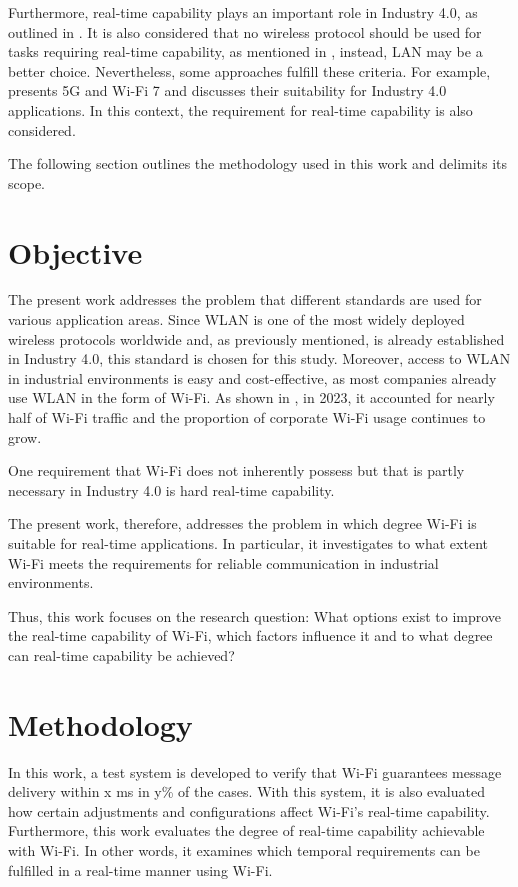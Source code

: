 Furthermore, real-time capability plays an important role in Industry 4.0, as outlined in \cite[p. 1]{fi16090345}.  
It is also considered that no wireless protocol should be used for tasks requiring real-time capability, as mentioned in \cite{wollert}, instead, LAN may be a better choice.  
Nevertheless, some approaches fulfill these criteria.  
For example, \cite{fi16090345} presents 5G and Wi-Fi 7 and discusses their suitability for Industry 4.0 applications.  
In this context, the requirement for real-time capability is also considered.  

The following section outlines the methodology used in this work and delimits its scope.  

\section{Objective} \label{subsec:objective}
The present work addresses the problem that different standards are used for various application areas.  
Since \ac{WLAN} is one of the most widely deployed wireless protocols worldwide and, as previously mentioned, is already established in Industry 4.0, this standard is chosen for this study.  
Moreover, access to \ac{WLAN} in industrial environments is easy and cost-effective, as most companies already use \ac{WLAN} in the form of Wi-Fi.  
As shown in \cite{statista-wifi-indsutry}, in 2023, it accounted for nearly half of Wi-Fi traffic and the proportion of corporate Wi-Fi usage continues to grow.  

One requirement that Wi-Fi does not inherently possess but that is partly necessary in Industry 4.0 is hard real-time capability.  

The present work, therefore, addresses the problem in which degree Wi-Fi is suitable for real-time applications.  
In particular, it investigates to what extent Wi-Fi meets the requirements for reliable communication in industrial environments.  

Thus, this work focuses on the research question:  
What options exist to improve the real-time capability of Wi-Fi, which factors influence it and to what degree can real-time capability be achieved?

\section{Methodology} \label{subsec:meth}
In this work, a test system is developed to verify that Wi-Fi guarantees message delivery within x ms in y\% of the cases.  
With this system, it is also evaluated how certain adjustments and configurations affect Wi-Fi's real-time capability.  
Furthermore, this work evaluates the degree of real-time capability achievable with Wi-Fi.  
In other words, it examines which temporal requirements can be fulfilled in a real-time manner using Wi-Fi.  


